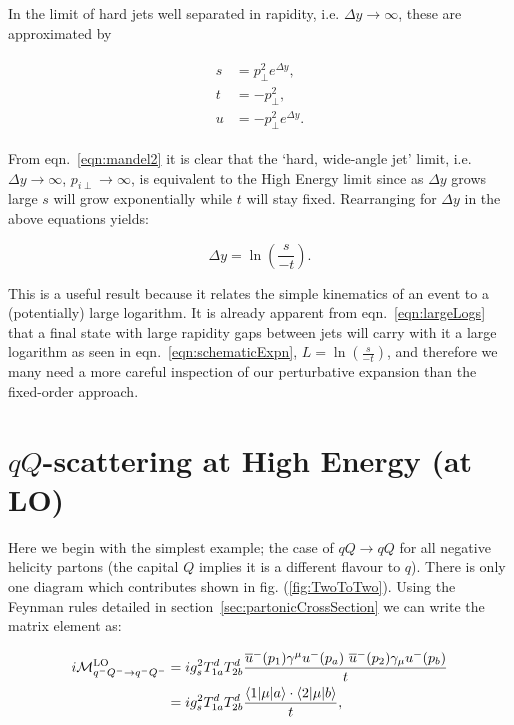 		In the limit of hard jets well separated in rapidity, i.e. $\Delta y\rightarrow\infty$,
		these are approximated by

		\begin{align}
		\begin{split}
			s &= p_\perp^2 e^{\Delta y},\\
			t &= -p_\perp^2,\\
			u &= -p_\perp^2 e^{\Delta y}.
			\label{eqn:mandel2}
		\end{split}
		\end{align}

		From  eqn.~\eqref{eqn:mandel2} it is clear that the `hard, wide-angle jet' limit, i.e. $\Delta y\to\infty$,
		$p_{i\perp}\to\infty$, is equivalent to the High Energy limit since as $\Delta y$ grows large $s$ will
		grow exponentially while $t$ will stay fixed.  Rearranging for $\Delta y$ in the above equations yields:

		\begin{equation}
			\Delta y = \ln \left(\frac{s}{-t}\right).
			\label{eqn:largeLogs}
		\end{equation}

		This is a useful result because it relates the simple kinematics of an event to a (potentially)
		large logarithm.  It is already apparent from eqn.~\eqref{eqn:largeLogs} that a final state
		with large rapidity gaps between jets will carry with it a large logarithm as seen in
		eqn.~\eqref{eqn:schematicExpn}, $L=\ln \left(\frac{s}{-t}\right)$, and therefore we many need a
		more careful inspection of our perturbative expansion than the fixed-order approach.

	\section{$qQ$-scattering at High Energy (at LO)}
		\label{sec:qQScat}

		Here we begin with the simplest example; the case of $qQ\rightarrow qQ$ for all negative helicity partons
		(the capital $Q$ implies it is a different flavour to $q$).  There is only one diagram which contributes shown
		in fig. (\ref{fig:TwoToTwo}).  Using the Feynman rules detailed in section~\ref{sec:partonicCrossSection} we can
		write the matrix element as:

		\begin{align}
			i\mathcal{M}_{q^-Q^-\rightarrow q^-Q^-}^{\text{LO}} &= ig_s^2T^d_{1a}T^d_{2b}
			\frac{\overline{u}^-(p_1)\gamma^\mu
			  u^-(p_a)\text{ }\overline{u}^-(p_2)\gamma_\mu u^-(p_b)}{t}\\
			  &= ig_s^2T^d_{1a}T^d_{2b}\frac{\langle 1 | \mu | a \rangle\cdot\langle 2 | \mu | b \rangle}{t},
			  \label{eqn:similarBrackets}
		\end{align}

